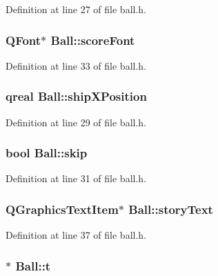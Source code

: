 Definition at line 27 of file ball.h.\hypertarget{class_ball_a7e1772c390324066ab62d42f18dbd04d}{
\subsubsection[{scoreFont}]{\setlength{\rightskip}{0pt plus 5cm}QFont$\ast$ {\bf Ball::scoreFont}}}
\label{class_ball_a7e1772c390324066ab62d42f18dbd04d}


Definition at line 33 of file ball.h.\hypertarget{class_ball_a3d1c8506eef7e0fbac97df090d320cfd}{
\subsubsection[{shipXPosition}]{\setlength{\rightskip}{0pt plus 5cm}qreal {\bf Ball::shipXPosition}}}
\label{class_ball_a3d1c8506eef7e0fbac97df090d320cfd}


Definition at line 29 of file ball.h.\hypertarget{class_ball_a41ecbffc5befc38ab013c41fe86cda41}{
\subsubsection[{skip}]{\setlength{\rightskip}{0pt plus 5cm}bool {\bf Ball::skip}}}
\label{class_ball_a41ecbffc5befc38ab013c41fe86cda41}


Definition at line 31 of file ball.h.\hypertarget{class_ball_a0c03dcd274f553cc049ed0ede546b33f}{
\subsubsection[{storyText}]{\setlength{\rightskip}{0pt plus 5cm}QGraphicsTextItem$\ast$ {\bf Ball::storyText}}}
\label{class_ball_a0c03dcd274f553cc049ed0ede546b33f}


Definition at line 37 of file ball.h.\hypertarget{class_ball_a5129c6e48575e4599ad1d5aba6e26e2b}{
\subsubsection[{t}]{$\ast$ {\bf Ball::t}}}
\label{class_ball_a5129c6e48575e4599ad1d5aba6e26e2b}



